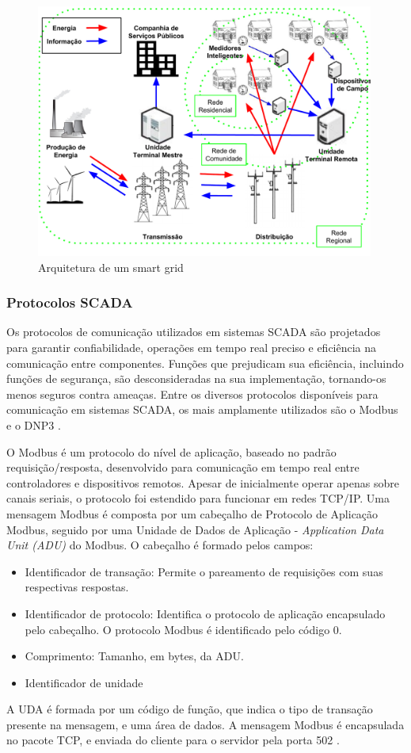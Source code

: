 \documentclass[cic,tc]{iiufrgs}
\begin{document}
\begin{figure}[h]
   \caption{Arquitetura de um smart grid}
   \begin{center}
       \includegraphics[width=30em]{smart_grid_arch}
   \end{center}
   \label{fig:sgarchitecture}
\end{figure}

\subsubsection{Protocolos SCADA}

Os protocolos de comunicação utilizados em sistemas SCADA são projetados para garantir confiabilidade, operações em tempo real preciso e eficiência na comunicação entre componentes. Funções que prejudicam sua eficiência, incluindo funções de segurança, são desconsideradas na sua implementação, tornando-os menos seguros contra ameaças. Entre os diversos protocolos disponíveis para comunicação em sistemas SCADA, os mais amplamente utilizados são o Modbus e o DNP3 \cite{drias2015taxonomy}.

O Modbus é um protocolo do nível de aplicação, baseado no padrão requisição/resposta, desenvolvido para comunicação em tempo real entre controladores e dispositivos remotos. Apesar de inicialmente operar apenas sobre canais seriais, o protocolo foi estendido para funcionar em redes TCP/IP. Uma mensagem Modbus é composta por um cabeçalho de Protocolo de Aplicação Modbus, seguido por uma Unidade de Dados de Aplicação - \emph{Application Data Unit (ADU)} do Modbus. O cabeçalho é formado pelos campos:
\begin{itemize}
\item{Identificador de transação}: Permite o pareamento de requisições com suas respectivas respostas.
\item{Identificador de protocolo}: Identifica o protocolo de aplicação encapsulado pelo cabeçalho. O protocolo Modbus é identificado pelo código 0.
\item{Comprimento}: Tamanho, em bytes, da ADU.
\item{Identificador de unidade}
\end{itemize}
A UDA é formada por um código de função, que indica o tipo de transação presente na mensagem, e uma área de dados. A mensagem Modbus é encapsulada no pacote TCP, e enviada do cliente para o servidor pela porta 502 \cite{drias2015taxonomy}.
\end{document}
